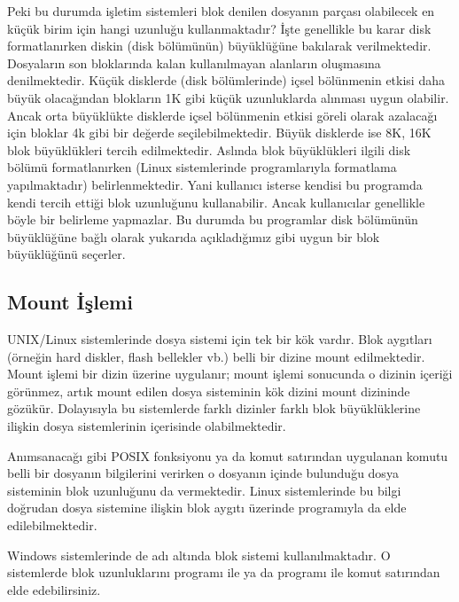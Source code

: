 \documentclass[a4paper,10pt,turkish]{sphinxmanual}
\begin{document}
\sphinxAtStartPar
Peki bu durumda işletim sistemleri blok denilen dosyanın parçası olabilecek en küçük birim için hangi uzunluğu
kullanmaktadır? İşte genellikle bu karar disk formatlanırken diskin (disk bölümünün) büyüklüğüne bakılarak verilmektedir.
Dosyaların son bloklarında kalan kullanılmayan alanların oluşmasına 
denilmektedir. Küçük disklerde (disk bölümlerinde) içsel bölünmenin etkisi daha büyük olacağından blokların 1K gibi
küçük uzunluklarda alınması uygun olabilir. Ancak orta büyüklükte disklerde içsel bölünmenin etkisi göreli olarak
azalacağı için bloklar 4k gibi bir değerde seçilebilmektedir. Büyük disklerde ise 8K, 16K blok büyüklükleri tercih
edilmektedir. Aslında blok büyüklükleri ilgili disk bölümü formatlanırken (Linux sistemlerinde  programlarıyla
formatlama yapılmaktadır) belirlenmektedir. Yani kullanıcı isterse kendisi bu programda kendi tercih ettiği blok
uzunluğunu kullanabilir. Ancak kullanıcılar genellikle böyle bir belirleme yapmazlar. Bu durumda bu programlar disk
bölümünün büyüklüğüne bağlı olarak yukarıda açıkladığımız gibi uygun bir blok büyüklüğünü seçerler.


\subsection{Mount İşlemi}
\label{\detokenize{filesystem1:mount-islemi}}
\sphinxAtStartPar
UNIX/Linux sistemlerinde dosya sistemi için tek bir kök vardır. Blok aygıtları (örneğin hard
diskler, flash bellekler vb.) belli bir dizine mount edilmektedir. Mount işlemi bir dizin üzerine
uygulanır; mount işlemi sonucunda o dizinin içeriği görünmez, artık mount edilen dosya sisteminin
kök dizini mount dizininde gözükür. Dolayısıyla bu sistemlerde farklı dizinler farklı blok
büyüklüklerine ilişkin dosya sistemlerinin içerisinde olabilmektedir.

\sphinxAtStartPar
Anımsanacağı gibi  POSIX fonksiyonu ya da komut satırından uygulanan  komutu belli
bir dosyanın bilgilerini verirken o dosyanın içinde bulunduğu dosya sisteminin blok uzunluğunu
da vermektedir. Linux sistemlerinde bu bilgi doğrudan dosya sistemine ilişkin blok aygıtı
üzerinde  programıyla da elde edilebilmektedir.

\sphinxAtStartPar
Windows sistemlerinde de  adı altında blok sistemi kullanılmaktadır. O sistemlerde blok
uzunluklarını  programı ile ya da  programı ile komut satırından elde
edebilirsiniz.
\end{document}
